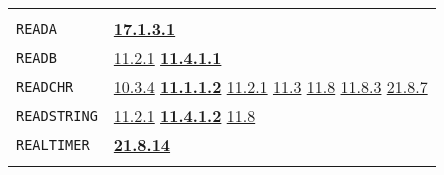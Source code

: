 \documentclass[a4paper]{scrbook}
\begin{document}
\begin{longtable}[]{@{}ll@{}}
\begin{minipage}[t]{0.70\columnwidth}
\end{minipage}\tabularnewline
\begin{minipage}[t]{0.24\columnwidth}\raggedright\strut
\texttt{READA}\strut
\end{minipage} & \begin{minipage}[t]{0.70\columnwidth}\raggedright\strut
\textbf{\href{17-macro-operations.md\#17131-read-finally}{17.1.3.1}}\strut
\end{minipage}\tabularnewline
\begin{minipage}[t]{0.24\columnwidth}\raggedright\strut
\texttt{READB}\strut
\end{minipage} & \begin{minipage}[t]{0.70\columnwidth}\raggedright\strut
\href{11-input-output.md\#1121-open}{11.2.1} \textbf{\href{11-input-output.md\#11411-readb}{11.4.1.1}}\strut
\end{minipage}\tabularnewline
\begin{minipage}[t]{0.24\columnwidth}\raggedright\strut
\texttt{READCHR}\strut
\end{minipage} & \begin{minipage}[t]{0.70\columnwidth}\raggedright\strut
\href{10-looping.md\#1034-only-two-arguments}{10.3.4} \textbf{\href{11-input-output.md\#11112-readchr}{11.1.1.2}}
\href{11-input-output.md\#1121-open}{11.2.1} \href{11-input-output.md\#113-end-of-file-routine}{11.3}
\href{11-input-output.md\#118-terminal-channels}{11.8} \href{11-input-output.md\#1183-tyi}{11.8.3}
\href{21-interrupts.md\#2187-blocked}{21.8.7}\strut
\end{minipage}\tabularnewline
\begin{minipage}[t]{0.24\columnwidth}\raggedright\strut
\texttt{READSTRING}\strut
\end{minipage} & \begin{minipage}[t]{0.70\columnwidth}\raggedright\strut
\href{11-input-output.md\#1121-open}{11.2.1} \textbf{\href{11-input-output.md\#11412-readstring}{11.4.1.2}}
\href{11-input-output.md\#118-terminal-channels}{11.8}\strut
\end{minipage}\tabularnewline
\begin{minipage}[t]{0.24\columnwidth}\raggedright\strut
\texttt{REALTIMER}\strut
\end{minipage} & \begin{minipage}[t]{0.70\columnwidth}\raggedright\strut
\textbf{\href{21-interrupts.md\#21814-runt-and-realt}{21.8.14}}\strut
\end{minipage}\tabularnewline
\begin{minipage}[t]{0.24\columnwidth}\raggedright\strut

\end{minipage}
\end{longtable}
\end{document}
